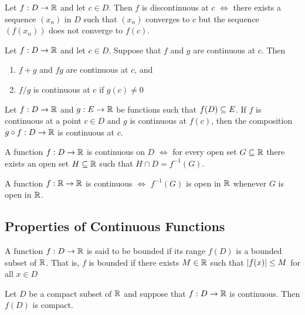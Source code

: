 \documentclass[12pt]{article}
\begin{document}
\begin{theorem}
  Let $f : D \rightarrow \mathbb{R}$ and let $c \in D$. Then $f$ is discontinuous at
  $c$ $\iff$ there exists a sequence $(x_n)$ in $D$ such that $(x_n)$ converges
  to $c$ but the sequence $(f(x_n))$ does not converge to $f(c)$.
\end{theorem}

\begin{theorem}
  Let $f : D \rightarrow \mathbb{R}$ and let $c \in D$. Suppose that $f$ and $g$ are
  continuous at $c$. Then
  \begin{enumerate}
  \item $f + g$ and $fg$ are continuous at $c$, and
  \item $f / g$ is continuous at $c$ if $g(c) \ne 0$
  \end{enumerate}
\end{theorem}

\begin{theorem}
  Let $f : D \rightarrow \mathbb{R}$ and $g : E \rightarrow \mathbb{R}$ be functions such
  that $f(D) \subseteq E$. If $f$ is continuous at a point $c \in D$ and $g$ is
  continuous at $f(c)$, then the composition $g \circ f : D \rightarrow \mathbb{R}$
  is continuous at $c$.
\end{theorem}

\begin{theorem}
  A function $f : D \rightarrow \mathbb{R}$ is continuous on $D$ $\iff$ for every
  open set $G \subseteq \mathbb{R}$ there exists an open set $H \subseteq \mathbb{R}$ such that $H \cap
  D = f^{-1}(G)$.
\end{theorem}

\begin{corollary}
  A function $f: \mathbb{R} \rightarrow \mathbb{R}$ is continuous $\iff$ $f^{-1}(G)$ is
  open in $\mathbb{R}$ whenever $G$ is open in $\mathbb{R}$.
\end{corollary}

\subsection{Properties of Continuous Functions}
\label{sec:org92d4deb}
\begin{definition}[Bounded]
  A function $f: D \rightarrow \mathbb{R}$ is said to be bounded if its range $f(D)$
  is a bounded subset of $\mathbb{R}$. That is, $f$ is bounded if there exists $M \in
  \mathbb{R}$ such that $\left|f(x)\right| \le M$ for all $x \in D$
\end{definition}

\begin{theorem}
  Let $D$ be a compact subset of $\mathbb{R}$ and suppose that $f : D \rightarrow
  \mathbb{R}$ is continuous. Then $f(D)$ is compact.
\end{theorem}
\end{document}
